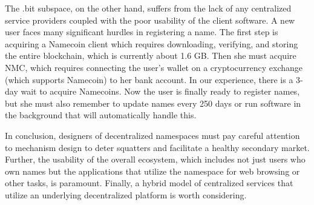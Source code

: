 The .bit subspace, on the other hand, suffers from the lack of any centralized service providers coupled with the poor usability of the client software. A new user faces many significant hurdles in registering a name. The first step is acquiring a Namecoin client which requires downloading, verifying, and storing the entire blockchain, which is currently about 1.6 GB. Then she must acquire NMC, which requires connecting the user's wallet on a cryptocurrency exchange (which supports Namecoin) to her bank account. In our experience, there is a 3-day wait to acquire Namecoins. Now the user is finally ready to register names, but she must also remember to update names every 250 days or run software in the background that will automatically handle this.

In conclusion, designers of decentralized namespaces must pay careful attention to mechanism design to deter squatters and facilitate a healthy secondary market. Further, the usability of the overall ecosystem, which includes not just users who own names but the applications that utilize the namespace for web browsing or other tasks, is paramount. Finally, a hybrid model of centralized services that utilize an underlying decentralized platform is worth considering.

